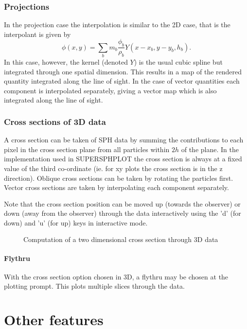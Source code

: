 \documentclass[a4paper,12pt]{article}
\begin{document}
\subsubsection{Projections} 
 In the projection case the interpolation is similar to the 2D case, that is the interpolant is
given by
\begin{equation}
\phi(x,y) = \sum_b m_b \frac{\phi_b}{\rho_b} Y(x - x_b, y-y_b, h_b).
\end{equation}
In this case, however, the kernel (denoted $Y$) is the usual cubic spline but integrated through one spatial
dimension. This results in a map of the rendered quantity integrated along the line of sight.
In the case of vector quantities each component is interpolated separately, giving a vector
map which is also integrated along the line of
sight.

\subsubsection{Cross sections of 3D data}
 A cross section can be taken of SPH data by summing the
contributions to each pixel in the cross section plane from all particles within
$2h$ of the plane. In
the implementation used in SUPERSPHPLOT the cross section is always at a fixed value of the third co-ordinate
(ie. for xy plots the cross section is in the z direction). Oblique cross
sections can be taken by rotating the particles first. Vector cross sections are taken by
interpolating each component separately.

 Note that the cross section position can be moved up (towards the observer) or down (away from the
 observer) through the data interactively using
the 'd' (for down) and 'u' (for up) keys in interactive mode.

\begin{figure}
\begin{center}
\caption{Computation of a two dimensional cross section through 3D data}
\label{fig:xsec3D}
\end{center}
\end{figure}

\paragraph{Flythru}
 With the cross section option chosen in 3D, a flythru may be chosen at the plotting prompt. This
plots multiple slices through the data.

\section{Other features}
\end{document}
